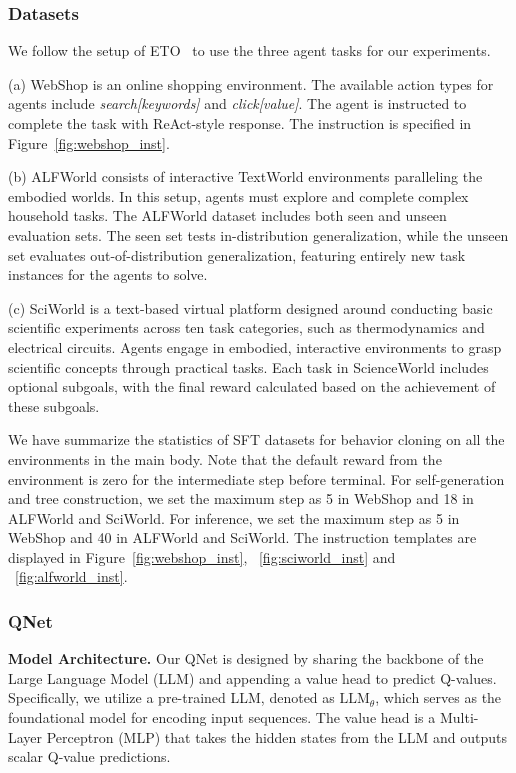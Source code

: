 \subsubsection{Datasets}
We follow the setup of ETO~\citep{song-etal-2024-eto} to use the three agent tasks for our experiments.

(a) WebShop is an online shopping environment. The available action types for agents include \textit{search[keywords]} and \textit{click[value]}. The agent is instructed to complete the task with ReAct\citep{yao2023react}-style response. The instruction is specified in Figure~\ref{fig:webshop_inst}. 

(b) ALFWorld \citep{shridhar2021alfworld} consists of interactive TextWorld environments paralleling the embodied worlds. In this setup, agents must explore and complete complex household tasks. The ALFWorld dataset includes both seen and unseen evaluation sets. The seen set tests in-distribution generalization, while the unseen set evaluates out-of-distribution generalization, featuring entirely new task instances for the agents to solve.

(c) SciWorld \citep{wang2022scienceworld} is a text-based virtual platform designed around conducting basic scientific experiments across ten task categories, such as thermodynamics and electrical circuits. Agents engage in embodied, interactive environments to grasp scientific concepts through practical tasks. Each task in ScienceWorld includes optional subgoals, with the final reward calculated based on the achievement of these subgoals.

We have summarize the statistics of SFT datasets for behavior cloning on all the environments in the main body. Note that the default reward from the environment is zero for the intermediate step before terminal. For self-generation and tree construction, we set the maximum step as 5 in WebShop and 18 in ALFWorld and SciWorld. For inference, we set the maximum step as 5 in WebShop and 40 in ALFWorld and SciWorld. The instruction templates are displayed in Figure~\ref{fig:webshop_inst}, ~\ref{fig:sciworld_inst} and ~\ref{fig:alfworld_inst}.


\subsubsection{QNet}\label{appendix:qnet}

\textbf{Model Architecture.}
Our QNet is designed by sharing the backbone of the Large Language Model (LLM) and appending a value head to predict Q-values. Specifically, we utilize a pre-trained LLM, denoted as $\text{LLM}_\theta$, which serves as the foundational model for encoding input sequences. The value head is a Multi-Layer Perceptron (MLP) that takes the hidden states from the LLM and outputs scalar Q-value predictions.

